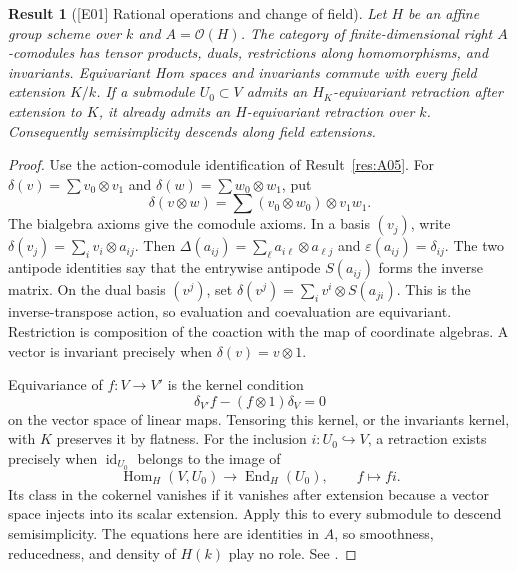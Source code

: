 \documentclass[11pt,a4paper,openany,oneside]{book}
\theoremstyle{resultstyle}
\newtheorem{statement}{Result}[chapter]
\newenvironment{result}[2]{\clubpenalty=10000\begin{statement}[\textnormal{[#1]} #2]\leavevmode\label{res:#1}\ignorespaces}{\end{statement}}
\theoremstyle{definition}
\numberwithin{equation}{chapter}
\begin{document}
\begin{result}{E01}{Rational operations and change of field}
Let \(H\) be an affine group scheme over \(k\) and \(A=\mathcal O(H)\). The category of finite-dimensional right \(A\)-comodules has tensor products, duals, restrictions along homomorphisms, and invariants. Equivariant Hom spaces and invariants commute with every field extension \(K/k\). If a submodule \(U_0\subset V\) admits an \(H_K\)-equivariant retraction after extension to \(K\), it already admits an \(H\)-equivariant retraction over \(k\). Consequently semisimplicity descends along field extensions.
\end{result}
\begin{proof}
Use the action-comodule identification of Result~\ref{res:A05}. For \(\delta(v)=\sum v_0\otimes v_1\) and \(\delta(w)=\sum w_0\otimes w_1\), put
\[
 \delta(v\otimes w)=\sum(v_0\otimes w_0)\otimes v_1w_1.
\]
The bialgebra axioms give the comodule axioms. In a basis \((v_j)\), write \(\delta(v_j)=\sum_i v_i\otimes a_{ij}\). Then \(\Delta(a_{ij})=\sum_\ell a_{i\ell}\otimes a_{\ell j}\) and \(\varepsilon(a_{ij})=\delta_{ij}\). The two antipode identities say that the entrywise antipode \(S(a_{ij})\) forms the inverse matrix. On the dual basis \((v^j)\), set \(\delta(v^j)=\sum_i v^i\otimes S(a_{ji})\). This is the inverse-transpose action, so evaluation and coevaluation are equivariant. Restriction is composition of the coaction with the map of coordinate algebras. A vector is invariant precisely when \(\delta(v)=v\otimes1\).

Equivariance of \(f\colon V\to V'\) is the kernel condition
\[
 \delta_{V'}f-(f\otimes1)\delta_V=0
\]
on the vector space of linear maps. Tensoring this kernel, or the invariants kernel, with \(K\) preserves it by flatness. For the inclusion \(i\colon U_0\hookrightarrow V\), a retraction exists precisely when \(\operatorname{id}_{U_0}\) belongs to the image of
\[
 \operatorname{Hom}_H(V,U_0)\longrightarrow\operatorname{End}_H(U_0),
 \qquad f\longmapsto f i .
\]
Its class in the cokernel vanishes if it vanishes after extension because a vector space injects into its scalar extension. Apply this to every submodule to descend semisimplicity. The equations here are identities in \(A\), so smoothness, reducedness, and density of \(H(k)\) play no role. See \cite[Chapter~4, especially 4.3--4.5, 4.19--4.20 and 4.31--4.34]{milne}.
\end{proof}
\end{document}
